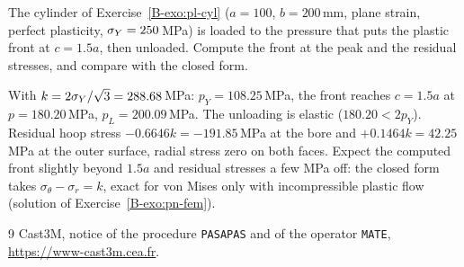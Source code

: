 \label{exo:cc-residual}
%
The cylinder of Exercise~\ref{B-exo:pl-cyl} ($a=100$, $b=200$\,mm, plane
strain, perfect plasticity, $\sigma_{Y}=250$\,MPa) is loaded to the pressure that
puts the plastic front at $c=1.5a$, then unloaded. Compute the front at the
peak and the residual stresses, and compare with the closed form.
\begin{solution}
With $k=2\sigma_{Y}/\sqrt3=288.68$\,MPa: $p_Y=108.25$\,MPa, the front reaches
$c=1.5a$ at $p=180.20$\,MPa, $p_L=200.09$\,MPa. The unloading is elastic
($180.20<2p_Y$). Residual hoop stress $-0.6646k=-191.85$\,MPa at the bore and
$+0.1464k=42.25$\,MPa at the outer surface, radial stress zero on both faces.
Expect the computed front slightly beyond $1.5a$ and residual stresses a few
MPa off: the closed form takes $\sigma_\theta-\sigma_r=k$, exact for von Mises
only with incompressible plastic flow (solution of
Exercise~\ref{B-exo:pn-fem}).

\end{solution}

\begin{chapterbib}{9}
 Cast3M, notice of the procedure \texttt{PASAPAS} and
  of the operator \texttt{MATE}, \url{https://www-cast3m.cea.fr}.
\end{chapterbib}
